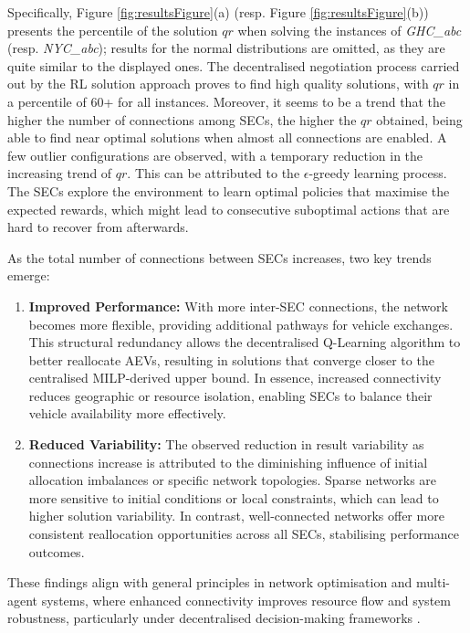 Specifically, Figure \ref{fig:resultsFigure}(a) (resp. Figure \ref{fig:resultsFigure}(b)) presents the percentile of the
solution $qr$ when solving the instances of \emph{GHC\_abc} (resp. \emph{NYC\_abc}); results for the normal
distributions are omitted, as they are quite similar to the displayed ones.
The decentralised negotiation process carried out by the RL solution approach proves to find high quality solutions,
with $qr$ in a percentile of 60+ for all instances.
Moreover, it seems to be a trend that the higher the number of connections among SECs, the higher the $qr$
obtained, being able to find near optimal solutions when almost all connections are enabled.
A few outlier configurations are observed, with a temporary reduction in the increasing trend of $qr$.
This can be attributed to the $\epsilon$-greedy learning process. The SECs explore the environment to learn optimal policies that maximise the
expected rewards, which might lead to consecutive suboptimal actions that are hard to recover from afterwards.

As the total number of connections between SECs increases, two key trends emerge:

\begin{enumerate}
    \item \textbf{Improved Performance:} With more inter-SEC connections, the network becomes more flexible, providing additional pathways for vehicle exchanges. This structural redundancy allows the decentralised Q-Learning algorithm to better reallocate AEVs, resulting in solutions that converge closer to the centralised MILP-derived upper bound. In essence, increased connectivity reduces geographic or resource isolation, enabling SECs to balance their vehicle availability more effectively.

    \item \textbf{Reduced Variability:} The observed reduction in result variability as connections increase is attributed to the diminishing influence of initial allocation imbalances or specific network topologies. Sparse networks are more sensitive to initial conditions or local constraints, which can lead to higher solution variability. In contrast, well-connected networks offer more consistent reallocation opportunities across all SECs, stabilising performance outcomes.
\end{enumerate}

These findings align with general principles in network optimisation and multi-agent systems, where enhanced connectivity improves resource flow and system robustness, particularly under decentralised decision-making frameworks \cite{klapp2020decentralized}.

